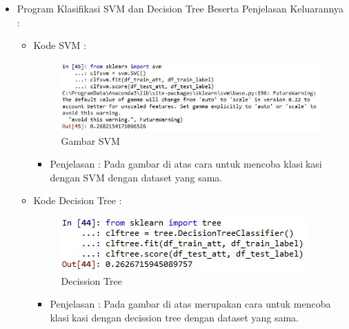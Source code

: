 \begin{enumerate}
\begin{itemize}
\begin{itemize}
\par
\par
\item Program Klasifikasi SVM dan Decision Tree Beserta Penjelasan Keluarannya :
\begin{itemize}
\item Kode SVM :
\par
\begin{figure}[ht]
\centering
\includegraphics[scale=0.7]{figures/hmm/cod25.jpg}
\caption{Gambar SVM}
\label{contoh}
\end{figure}
\par
\begin{itemize}
\item Penjelasan : Pada gambar di atas cara untuk mencoba klasikasi dengan SVM dengan dataset yang sama.
\par 
\par
\end{itemize}
\item Kode Decision Tree :
\par
\begin{figure}[ht]
\centering
\includegraphics[scale=0.7]{figures/hmm/cod24.jpg}
\caption{Decission Tree}
\label{contoh}
\end{figure}
\par
\begin{itemize}
\item Penjelasan : Pada gambar di atas merupakan cara untuk mencoba klasikasi dengan decission tree dengan dataset yang sama.
\par
\par
\end{itemize}
\end{itemize}




\end{itemize}
\end{itemize}
\end{enumerate}
